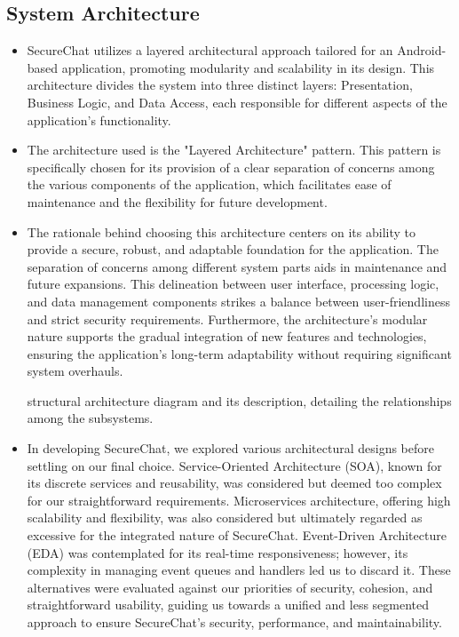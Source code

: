 \documentclass[]{article}
\begin{document}
\subsection{System Architecture}
\label{sub:system_architecture}
\begin{itemize}
	\item SecureChat utilizes a layered architectural approach tailored for an Android-based application, promoting modularity and scalability in its design. This architecture divides the system into three distinct layers: Presentation, Business Logic, and Data Access, each responsible for different aspects of the application's functionality.
	
	\item The architecture used is the "Layered Architecture" pattern. This pattern is specifically chosen for its provision of a clear separation of concerns among the various components of the application, which facilitates ease of maintenance and the flexibility for future development.

	\item The rationale behind choosing this architecture centers on its ability to provide a secure, robust, and adaptable foundation for the application. The separation of concerns among different system parts aids in maintenance and future expansions. This delineation between user interface, processing logic, and data management components strikes a balance between user-friendliness and strict security requirements. Furthermore, the architecture's modular nature supports the gradual integration of new features and technologies, ensuring the application's long-term adaptability without requiring significant system overhauls.
	
	\item [structural architecture diagram and its description, detailing the relationships among the subsystems.]

	\item In developing SecureChat, we explored various architectural designs before settling on our final choice. Service-Oriented Architecture (SOA), known for its discrete services and reusability, was considered but deemed too complex for our straightforward requirements. Microservices architecture, offering high scalability and flexibility, was also considered but ultimately regarded as excessive for the integrated nature of SecureChat. Event-Driven Architecture (EDA) was contemplated for its real-time responsiveness; however, its complexity in managing event queues and handlers led us to discard it. These alternatives were evaluated against our priorities of security, cohesion, and straightforward usability, guiding us towards a unified and less segmented approach to ensure SecureChat's security, performance, and maintainability.
\end{itemize}
\end{document}
